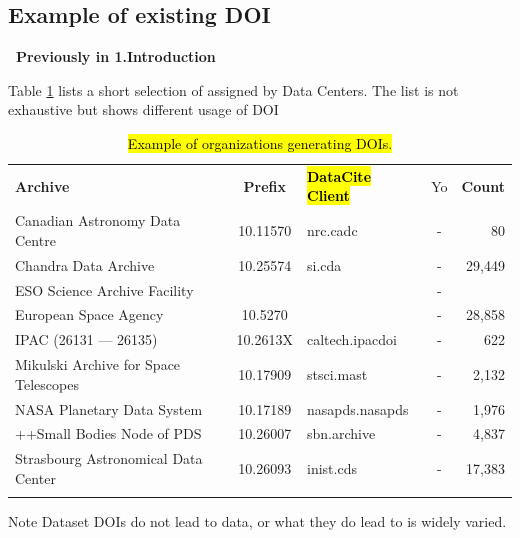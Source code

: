 \documentclass[11pt,a4paper]{ivoa}
\begin{document}
\subsection{Example of existing DOI}
\textbf{\color{red} Previously in 1.Introduction}

Table \ref{tab:astroDOIs1} lists a short selection of assigned by Data Centers. The list is not exhaustive but shows different usage of DOI  


\begin{table}[th]
\begin{tabular}{lclcr}
\sptablerule
\textbf{Archive} & \textbf{Prefix} & \hl{\textbf{DataCite Client}} & Yo & \textbf{Count} \\
\sptablerule
Canadian Astronomy Data Centre        & 10.11570 & nrc.cadc        & - &     80   \\
Chandra Data Archive                  & 10.25574 & si.cda          & - & 29,449   \\
ESO Science Archive Facility          &          &                 & - &          \\
European Space Agency                 & 10.5270  &                 & - & 28,858   \\
IPAC (26131 --- 26135)                & 10.2613X & caltech.ipacdoi & - &    622   \\
Mikulski Archive for Space Telescopes & 10.17909 & stsci.mast      & - &  2,132   \\
NASA Planetary Data System            & 10.17189 & nasapds.nasapds & - &  1,976   \\
++Small Bodies Node of PDS            & 10.26007 & sbn.archive     & - &  4,837   \\
Strasbourg Astronomical Data Center   & 10.26093 & inist.cds       & - & 17,383   \\
\sptablerule
\end{tabular}%
\caption{\label{tab:astroDOIs1} \hl{Example of organizations generating DOIs.}}
\end{table}


\begin{admonition}{Note}
Dataset DOIs do not lead to data, or what they do lead to is widely varied.
\end{admonition}

\end{document}
